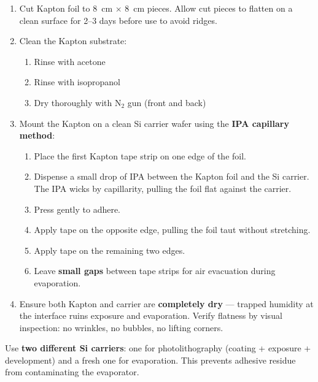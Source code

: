 \documentclass[11pt,a4paper]{article}
\begin{document}
\begin{enumerate}[label=\alph*)]
    \item Cut Kapton foil to \SI{8}{\cm} $\times$ \SI{8}{\cm} pieces.
          Allow cut pieces to flatten on a clean surface for 2--3 days
          before use to avoid ridges.
    \item Clean the Kapton substrate:
    \begin{enumerate}[label=\roman*)]
        \item Rinse with acetone
        \item Rinse with isopropanol
        \item Dry thoroughly with N$_2$ gun (front and back)
    \end{enumerate}
    \item Mount the Kapton on a clean Si carrier wafer using the
          \textbf{IPA capillary method}:
    \begin{enumerate}[label=\roman*)]
        \item Place the first Kapton tape strip on one edge of the foil.
        \item Dispense a small drop of IPA between the Kapton foil and the
              Si carrier. The IPA wicks by capillarity, pulling the foil
              flat against the carrier.
        \item Press gently to adhere.
        \item Apply tape on the opposite edge, pulling the foil taut
              without stretching.
        \item Apply tape on the remaining two edges.
        \item Leave \textbf{small gaps} between tape strips for air
              evacuation during evaporation.
    \end{enumerate}
    \item Ensure both Kapton and carrier are \textbf{completely dry} ---
          trapped humidity at the interface ruins exposure and evaporation.
          Verify flatness by visual inspection: no wrinkles, no bubbles,
          no lifting corners.
\end{enumerate}

\begin{warningbox}[Important]
Use \textbf{two different Si carriers}: one for photolithography
(coating + exposure + development) and a fresh one for evaporation.
This prevents adhesive residue from contaminating the evaporator.
\end{warningbox}
\end{document}
